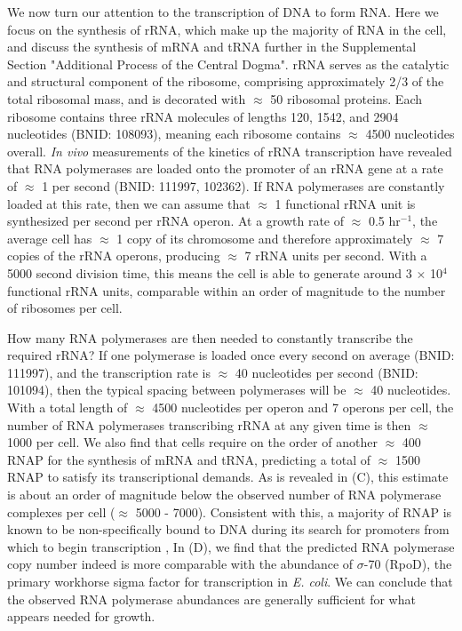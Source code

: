 We now turn our attention to the transcription of DNA to form RNA. Here we focus
on the synthesis of rRNA, which make up the majority of RNA in the cell, and
discuss the synthesis of mRNA and tRNA further in the Supplemental Section
"Additional Process of the Central Dogma". rRNA serves as the catalytic and
structural component of the ribosome, comprising approximately 2/3 of the total
ribosomal mass, and is decorated with $\approx$ 50 ribosomal proteins. Each
ribosome contains three rRNA molecules of lengths 120, 1542, and 2904
nucleotides (BNID: 108093), meaning each ribosome contains $\approx$ 4500
nucleotides overall. \textit{In vivo} measurements of the kinetics of rRNA
transcription have revealed that RNA polymerases are loaded onto the promoter of
an rRNA gene at a rate of $\approx$ 1 per second (BNID: 111997, 102362). If RNA
polymerases are constantly loaded at this rate, then we can assume that
$\approx$ 1 functional rRNA unit is synthesized per second per rRNA operon.  At
a growth rate of $\approx$ 0.5 hr$^{-1}$, the average cell has $\approx$ 1 copy
of its chromosome and therefore approximately $\approx$ 7 copies of the rRNA
operons, producing $\approx$ 7 rRNA units per second. With a 5000 second
division time, this means the cell is able to generate around 3 $\times$ 10$^4$
functional rRNA units, comparable within an order of magnitude to the number of
ribosomes per cell.

How many RNA polymerases are then needed to constantly transcribe the required
rRNA? If one polymerase is loaded once every second on average (BNID: 111997),
and the transcription rate is $\approx$ 40 nucleotides per second (BNID:
101094), then the typical spacing between polymerases will be $\approx$ 40
nucleotides. With a total length of $\approx$ 4500 nucleotides per operon and 7
operons per cell, the number of RNA polymerases transcribing rRNA at any given
time is then $\approx$ 1000 per cell. We also find that cells require on the
order of another $\approx$ 400 RNAP for the  synthesis of mRNA and tRNA,
predicting a total of  $\approx$ 1500 RNAP to satisfy its transcriptional
demands. As is revealed in (C), this estimate is about an
order of magnitude below the observed number of RNA polymerase complexes per
cell ($\approx$ 5000 - 7000). Consistent with this, a majority of RNAP is known
to be  non-specifically bound to DNA during its search for promoters from which
to begin transcription \citep{klumpp2008, patrick2015},  In
(D), we find that the predicted RNA polymerase copy number
indeed is more comparable with the abundance of $\sigma$-70 (RpoD), the primary
workhorse sigma factor for transcription in \textit{E. coli}. We can conclude
that the observed RNA polymerase abundances are generally sufficient for what
appears needed for growth.

